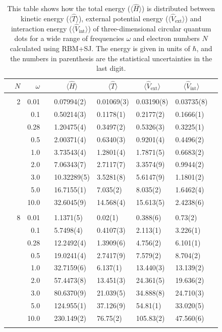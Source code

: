 \begin{table}[H]
	\caption{This table shows how the total energy ($\langle\hat{H}\rangle$) is distributed between kinetic energy ($\langle\hat{T}\rangle$), external potential energy ($\langle\hat{V}_{\text{ext}}\rangle$) and interaction energy ($\langle\hat{V}_{\text{int}}\rangle$) of three-dimensional circular quantum dots for a wide range of frequencies $\omega$ and electron numbers $N$ calculated using RBM+SJ. The energy is given in units of $\hbar$, and the numbers in parenthesis are the statistical uncertainties in the last digit.}
	\label{tab:splitfrequencyQDRBMSJ3D}
	\begin{tabularx}{\textwidth}{R{1cm}rrcR{2.3cm}R{2.3cm}R{2.3cm}R{2.3cm}R{1cm}} \hline\hline
		\makecell{\\ \phantom{$N$}} & $N$ & $\omega$ &&  &  &  &  \\ \hline \\
		&2 & 0.01 && 0.07994(2) & 0.01069(3) & 0.03190(8) & 0.03735(8) \\
		&& 0.1 && 0.50214(3) & 0.1178(1) & 0.2177(2) & 0.1666(1) \\
		&& 0.28 && 1.20475(4) & 0.3497(2) & 0.5326(3) & 0.3225(1) \\
		&& 0.5 && 2.00371(4) & 0.6340(3) & 0.9201(4) & 0.4496(2) \\
		&& 1.0 && 3.73543(4) & 1.2801(4) & 1.7871(5) & 0.6683(2) \\
		&& 2.0 && 7.06343(7) & 2.7117(7) & 3.3574(9) & 0.9944(2) \\
		&& 3.0 && 10.32289(5) & 3.5281(8) & 5.6147(9) & 1.1801(2) \\ 
		&& 5.0 && 16.7155(1) & 7.035(2) & 8.035(2) & 1.6462(4) \\
		&& 10.0 && 32.6045(9) & 14.568(4) & 15.613(5) & 2.4238(6) \\
		\hdashline \\
		
		&8 & 0.01 && 1.1371(5) & 0.02(1) & 0.388(6) & 0.73(2) \\
		&& 0.1 && 5.7498(4) & 0.4107(3) & 2.113(1) & 3.226(1) \\
		&& 0.28 && 12.2492(4) & 1.3909(6) & 4.756(2) & 6.101(1) \\
		&& 0.5 && 19.0241(4) & 2.7417(9) & 7.579(2) & 8.704(2) \\
		&& 1.0 && 32.7159(6) & 6.137(1) & 13.440(3) & 13.139(2) \\
		&& 2.0 && 57.4473(8) & 13.451(3) & 24.361(5) & 19.636(2) \\
		&& 3.0 && 80.6370(9) & 21.039(5) & 34.888(8) & 24.710(3) \\ 
		&& 5.0 && 124.955(1) & 37.126(9) & 54.81(1) & 33.020(5) \\
		&& 10.0 && 230.149(2) & 76.75(2) & 105.83(2) & 47.560(6) \\
		\hdashline \\
		

\end{tabularx}
\end{table}
